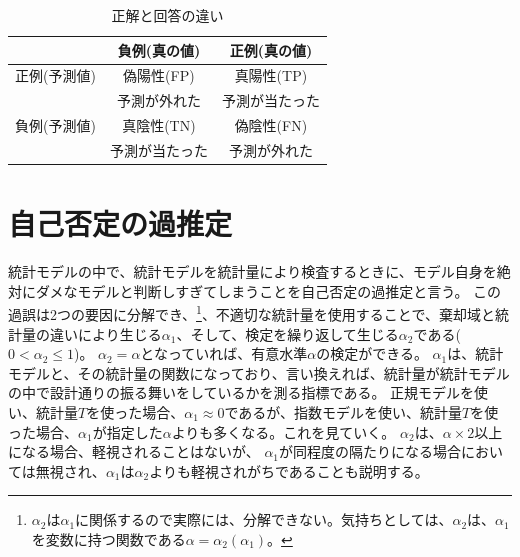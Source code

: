     
    \begin{table}[hbtp]
    \caption{正解と回答の違い}
    \label{table:Yes_no_answer}
    \centering
    \begin{tabular}{ccc}
          &  負例(真の値) & 正例(真の値)  \\
        \hline \hline
        正例(予測値) &  偽陽性(FP)  & 真陽性(TP)\\
        &予測が外れた & 予測が当たった\\
        負例(予測値) & 真陰性(TN) & 偽陰性(FN)\\
        & 予測が当たった & 予測が外れた\\
        \hline
    \end{tabular}
    \end{table}

    

\section{自己否定の過推定}
統計モデルの中で、統計モデルを統計量により検査するときに、モデル自身を絶対にダメなモデルと判断しすぎてしまうことを自己否定の過推定と言う。
この過誤は2つの要因に分解でき、\footnote{$\alpha_2$は$\alpha_1$に関係するので実際には、分解できない。気持ちとしては、$\alpha_2$は、$\alpha_1$を変数に持つ関数である$\alpha=\alpha_2(\alpha_1)$。}、不適切な統計量を使用することで、棄却域と統計量の違いにより生じる$\alpha_1$、そして、検定を繰り返して生じる$\alpha_2$である($0<\alpha_2 \leq 1$)。
$\alpha_2=\alpha$となっていれば、有意水準$\alpha$の検定ができる。
$\alpha_1$は、統計モデルと、その統計量の関数になっており、言い換えれば、統計量が統計モデルの中で設計通りの振る舞いをしているかを測る指標である。
正規モデルを使い、統計量$T$を使った場合、$\alpha_1 \approx	 0 $であるが、指数モデルを使い、統計量$T$を使った場合、$\alpha_1$が指定した$\alpha$よりも多くなる。これを見ていく。
$\alpha_2$は、$\alpha\times 2$以上になる場合、軽視されることはないが、
$\alpha_1$が同程度の隔たりになる場合においては無視され、$\alpha_1$は$\alpha_2$よりも軽視されがちであることも説明する。

